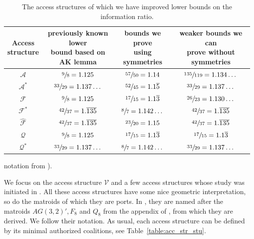 \documentclass[11pt, a4paper]{kybernetika}
\begin{document}
	\begin{table}[ht]
		\centering
		\begin{tabular}{|c|c|c|c|}
			\hline
			\thead{Access\\structure}&\thead{previously known lower\\bound based on\\AK lemma \cite{farras2020improving}}&\thead{bounds we prove\\using symmetries}&\thead{weaker bounds we can\\prove without symmetries}\\
			\hline
			$\mathcal{A}$&$\sfrac98=1.125$&$\sfrac{57}{50}=1.14$&$\sfrac{135}{119}=1.134\dots$\\
			\hline 
			$\mathcal{A}^*$&$\sfrac{33}{29}=1.137\dots$&$\sfrac{52}{45}=1.1\overline{5}$&$\sfrac{33}{29}=1.137\dots$\\
			\hline
			$\mathcal{F}$&$\sfrac98=1.125$&$\sfrac{17}{15}=1.1\overline{3}$&$\sfrac{26}{23}=1.130\dots$\\
			\hline
			$\mathcal{F}^*$&$\sfrac{42}{37}=1.\overline{135}$&$\sfrac87=1.142\dots$& $\sfrac{42}{37}=1.\overline{135}$\\
			\hline
			$\widehat{\mathcal{F}}$&$\sfrac{42}{37}=1.\overline{135}$&$\sfrac{23}{20}=1.15$&$\sfrac{42}{37}=1.\overline{135}$\\ 
			\hline
			$\mathcal{Q}$&$\sfrac98=1.125$&$\sfrac{17}{15}=1.1\overline{3}$&$\sfrac{17}{15}=1.1\overline{3}$\\ 
			\hline
			$\mathcal{Q}^*$&$\sfrac{33}{29}=1.137\dots$&$\sfrac87=1.142\dots$&$\sfrac{33}{29}=1.137\dots$\\
			\hline
		\end{tabular}	
		\smallskip
		\caption{The access structures of which we have improved lower bounds on the information ratio.}\label{table-sss-results}
	\end{table}
	
	\noindent
	notation from \cite{farras2020improving}).
	
	We focus on the access structure $\mathcal{V}$ and a few access structures whose study was initiated in \cite{farras2020improving}. All these access structures have some nice geometric interpretation, so do the matroids of which they are ports. 
	In \cite{farras2020improving}, they are named after the matroids $AG(3,2)',F_8$ and $Q_8$ from the appendix of \cite{oxley1992matroid}, from which they are derived. We follow their notation. As usual, each access structure can be defined by its minimal authorized coalitions, see Table~\ref{table:acc_str_stu}.
	
\end{document}

